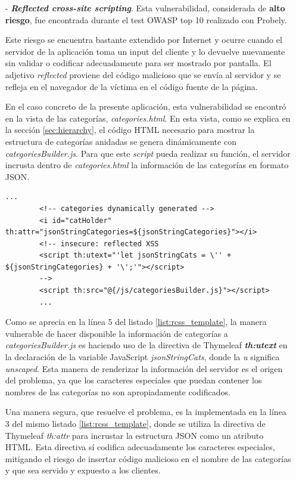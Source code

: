 \documentclass[a4paper]{article}
\begin{document}
	\begin{itemize}
		\item[-] \textbf{\emph{Reflected cross-site scripting}}. Esta vulnerabilidad, considerada de \textbf{alto riesgo}, fue encontrada durante el test OWASP top 10 realizado con Probely.
		
		Este riesgo se encuentra bastante extendido por Internet y ocurre cuando el servidor de la aplicación toma un input del cliente y lo devuelve nuevamente sin validar o codificar adecuadamente para ser mostrado por pantalla. El adjetivo \emph{reflected} proviene del código malicioso que se envía al servidor y se refleja en el navegador de la víctima en el código fuente de la página.
		
		En el caso concreto de la presente aplicación, esta vulnerabilidad se encontró en la vista de las categorías, \emph{categories.html}. En esta vista, como se explica en la sección \ref{sec:hierarchy}, el código HTML necesario para mostrar la estructura de categorías anidadas se genera dinámicamente con \emph{categoriesBuilder.js}. Para que este \emph{script} pueda realizar su función, el servidor incrusta dentro de \emph{categories.html} la información de las categorías en formato JSON.
		\\
		
		\begin{lstlisting}[caption=Extracto de categories.html con la vulnerabilidad encontrada,label=list:rcss_template]
		...
		<!-- categories dynamically generated -->
		<i id="catHolder" th:attr="jsonStringCategories=${jsonStringCategories}"></i>
		<!-- insecure: reflected XSS
		<script th:utext="'let jsonStringCats = \'' + ${jsonStringCategories} + '\';'"></script>
		-->
		<script th:src="@{/js/categoriesBuilder.js}"></script>
		...
		\end{lstlisting}
		
		Como se aprecia en la línea 5 del listado \ref{list:rcss_template}, la manera vulnerable de hacer disponible la información de categorías a \emph{categoriesBuilder.js} es haciendo uso de la directiva de Thymeleaf \textbf{\emph{th:utext}} en la declaración de la variable JavaScript \emph{jsonStringCats}, donde la \emph{u} significa \emph{unscaped}. Esta manera de renderizar la información del servidor es el origen del problema, ya que los caracteres especiales que puedan contener los nombres de las categorías no son apropiadamente codificados.
		
		Una manera segura, que resuelve el problema, es la implementada en la línea 3 del mismo listado \ref{list:rcss_template}, donde se utiliza la directiva de Thymeleaf \emph{th:attr} para incrustar la estructura JSON como un atributo HTML. Esta directiva sí codifica adecuadamente los caracteres especiales, mitigando el riesgo de insertar código malicioso en el nombre de las categorías y que sea servido y expuesto a los clientes.
		

\end{itemize}
\end{document}
